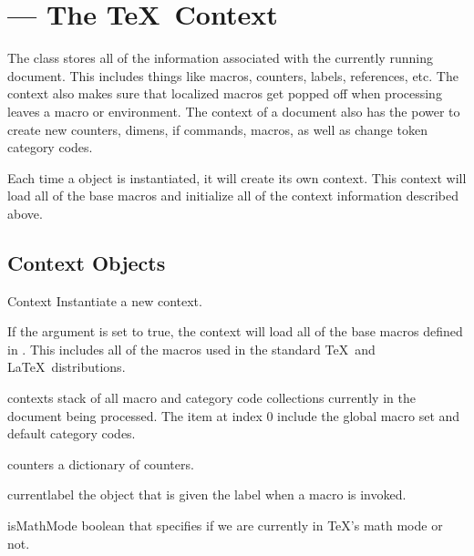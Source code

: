 
\section{ --- The \TeX\ Context\label{sec:context-api}}


The  class stores all of the information associated with
the currently running document.  This includes things like macros, counters,
labels, references, etc.  The context also makes sure that localized macros
get popped off when processing leaves a macro or environment.  The context
of a document also has the power to create new counters, dimens, if commands,
macros, as well as change token category codes.

Each time a  object is instantiated, it will create its own
context.  This context will load all of the base macros and initialize
all of the context information described above.


\subsection{Context Objects}

\begin{classdesc}{Context}{}
Instantiate a new context.

If the  argument is set to true, the context will load all of the
base macros defined in \plasTeX.  This includes all of the macros used in
the standard \TeX\ and \LaTeX\ distributions.
\end{classdesc}

\begin{memberdesc}[Context]{contexts}
stack of all macro and category code collections currently in the document
being processed.  The item at index 0 include the global macro set and
default category codes.
\end{memberdesc}

\begin{memberdesc}[Context]{counters}
a dictionary of counters.
\end{memberdesc}

\begin{memberdesc}[Context]{currentlabel}
the object that is given the label when a  macro is invoked.
\end{memberdesc}

\begin{memberdesc}[Context]{isMathMode}
boolean that specifies if we are currently in \TeX's math mode or not.
\end{memberdesc}

